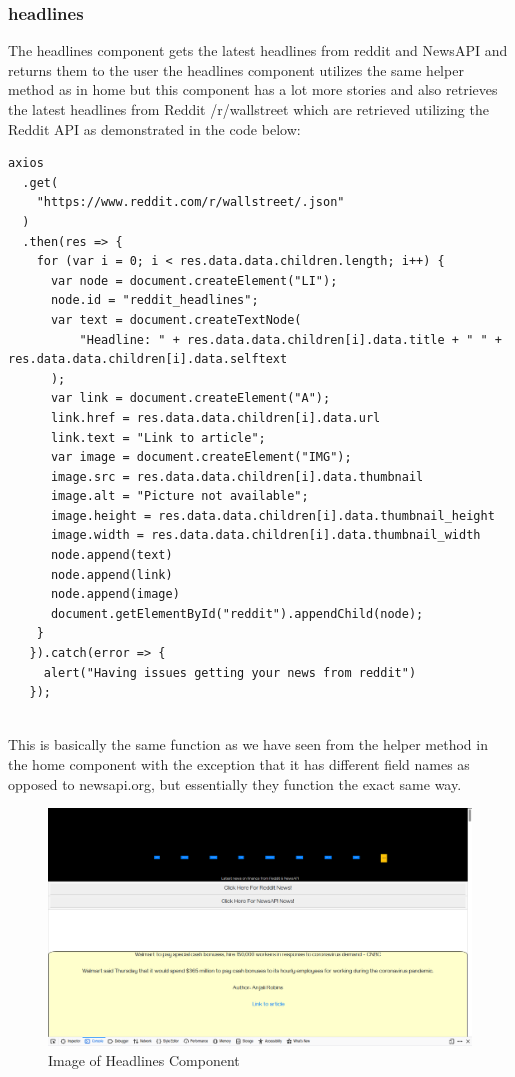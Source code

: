 \subsubsection{headlines}
The headlines component gets the latest headlines from reddit and NewsAPI and returns them to the user
the headlines component utilizes the same helper method as in home but this component has a lot more
stories and also retrieves the latest headlines from Reddit /r/wallstreet which are retrieved utilizing
the Reddit API as demonstrated in the code below:
\begin{verbatim}
axios
  .get(
    "https://www.reddit.com/r/wallstreet/.json"
  )
  .then(res => {
    for (var i = 0; i < res.data.data.children.length; i++) {
      var node = document.createElement("LI");
      node.id = "reddit_headlines";
      var text = document.createTextNode(
          "Headline: " + res.data.data.children[i].data.title + " " + res.data.data.children[i].data.selftext
      );
      var link = document.createElement("A");
      link.href = res.data.data.children[i].data.url
      link.text = "Link to article";
      var image = document.createElement("IMG");
      image.src = res.data.data.children[i].data.thumbnail
      image.alt = "Picture not available";
      image.height = res.data.data.children[i].data.thumbnail_height
      image.width = res.data.data.children[i].data.thumbnail_width
      node.append(text)
      node.append(link)
      node.append(image)
      document.getElementById("reddit").appendChild(node);
    }
   }).catch(error => {
     alert("Having issues getting your news from reddit")
   });
\end{verbatim}
\\
This is basically the same function as we have seen from the helper method in the home component with the
exception that it has different field names as opposed to newsapi.org, but essentially they function the
exact same way.
\begin{figure}[H]
\includegraphics[width=\textwidth]{img/headlinescomponent.png}
\caption{Image of Headlines Component}
\label{fig:Image of headlines component}
\end{figure}
